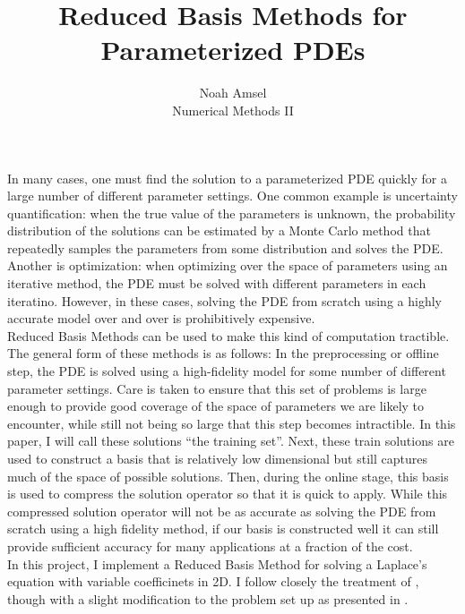 \documentclass[11pt]{article}
\begin{document}
\title{Reduced Basis Methods for Parameterized PDEs}
\author{Noah Amsel\\
Numerical Methods II}
\maketitle

In many cases, one must find the solution to a parameterized PDE
quickly for a large number of different parameter settings.
One common example is uncertainty quantification:
when the true value of the parameters is unknown, the probability distribution of the solutions
can be estimated by a Monte Carlo method that repeatedly samples the parameters from some distribution
and solves the PDE.
Another is optimization: when optimizing over the space of parameters using an
iterative method, the PDE must be solved with different parameters in each iteratino.
However, in these cases, solving the PDE from scratch using a highly accurate model over and over is prohibitively expensive.\\

Reduced Basis Methods can be used to make this kind of computation tractible.
The general form of these methods is as follows:
In the preprocessing or offline step, the PDE is solved using a high-fidelity model
for some number of different parameter settings.
Care is taken to ensure that this set of problems is large enough to provide good coverage
of the space of parameters we are likely to encounter, while still not being so large that this step becomes intractible.
In this paper, I will call these solutions ``the training set''.
Next, these train solutions are used to construct a basis that is relatively low dimensional but still captures
much of the space of possible solutions.
Then, during the online stage, this basis is used to compress the solution operator so that it is quick to apply.
While this compressed solution operator will not be as accurate as solving the PDE from scratch using a high fidelity method,
if our basis is constructed well it can still provide sufficient accuracy for many applications at a fraction of the cost.\\

In this project, I implement a Reduced Basis Method for solving a Laplace's equation with variable coefficinets in 2D.
I follow closely the treatment of \cite{certified}, though with a slight modification to the problem set up as presented in \cite{other}.
\end{document}
